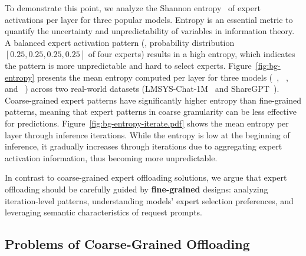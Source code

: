 %
To demonstrate this point, we analyze the Shannon entropy~\cite{shannon1948mathematical} of expert activations per \MoE layer for three popular \MoE models.
Entropy is an essential metric to quantify the uncertainty and unpredictability of variables in information theory.
A balanced expert activation pattern (\eg, probability distribution $[0.25, 0.25, 0.25, 0.25]$ of four experts) results in a high entropy, which indicates the pattern is more unpredictable and hard to select experts.
%
Figure~\ref{fig:bg-entropy} presents the mean entropy computed per layer for three \MoE models (\mixtral~\cite{jiang2024mixtral}, \qwen~\cite{yang2024qwen2}, and \phimoe~\cite{abdin2024phi}) across two real-world datasets (LMSYS-Chat-1M~\cite{zheng2023lmsys} and ShareGPT~\cite{sharegpt}).
Coarse-grained expert patterns have significantly higher entropy than fine-grained patterns, meaning that expert patterns in coarse granularity can be less effective for predictions.
%
Figure~\ref{fig:bg-entropy-iterate.pdf} shows the mean entropy per layer through inference iterations.
While the entropy is low at the beginning of inference, it gradually increases through iterations due to aggregating expert activation information, thus becoming more unpredictable.

In contrast to coarse-grained expert offloading solutions, we argue that expert offloading should be carefully guided by \textbf{fine-grained} designs: analyzing iteration-level patterns, understanding models' expert selection preferences, and leveraging semantic characteristics of request prompts. 


\subsection{Problems of Coarse-Grained Offloading}




